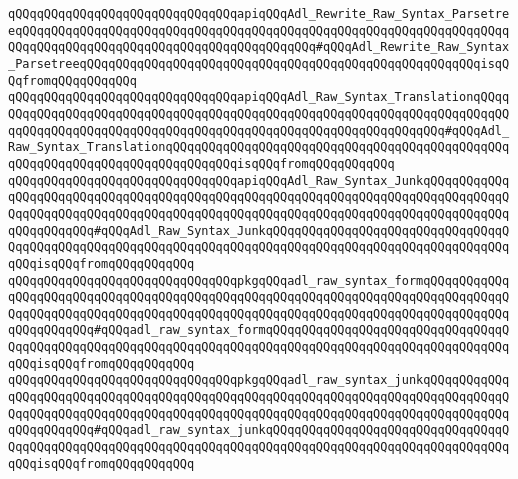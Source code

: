 \verb|qQQqqQQqqQQqqQQqqQQqqQQqqQQqqQQqapiqQQqAdl_Rewrite_Raw_Syntax_ParsetreeqQQqqQQqqQQqqQQqqQQqqQQqqQQqqQQqqQQqqQQqqQQqqQQqqQQqqQQqqQQqqQQqqQQqqQQqqQQqqQQqqQQqqQQqqQQqqQQqqQQqqQQqqQQqqQQq#qQQqAdl_Rewrite_Raw_Syntax_ParsetreeqQQqqQQqqQQqqQQqqQQqqQQqqQQqqQQqqQQqqQQqqQQqqQQqqQQqqQQqisqQQqfromqQQqqQQqqQQq|\newline
\verb|qQQqqQQqqQQqqQQqqQQqqQQqqQQqqQQqapiqQQqAdl_Raw_Syntax_TranslationqQQqqQQqqQQqqQQqqQQqqQQqqQQqqQQqqQQqqQQqqQQqqQQqqQQqqQQqqQQqqQQqqQQqqQQqqQQqqQQqqQQqqQQqqQQqqQQqqQQqqQQqqQQqqQQqqQQqqQQqqQQqqQQqqQQqqQQq#qQQqAdl_Raw_Syntax_TranslationqQQqqQQqqQQqqQQqqQQqqQQqqQQqqQQqqQQqqQQqqQQqqQQqqQQqqQQqqQQqqQQqqQQqqQQqqQQqqQQqisqQQqfromqQQqqQQqqQQq|\newline
\verb|qQQqqQQqqQQqqQQqqQQqqQQqqQQqqQQqapiqQQqAdl_Raw_Syntax_JunkqQQqqQQqqQQqqQQqqQQqqQQqqQQqqQQqqQQqqQQqqQQqqQQqqQQqqQQqqQQqqQQqqQQqqQQqqQQqqQQqqQQqqQQqqQQqqQQqqQQqqQQqqQQqqQQqqQQqqQQqqQQqqQQqqQQqqQQqqQQqqQQqqQQqqQQqqQQqqQQqqQQq#qQQqAdl_Raw_Syntax_JunkqQQqqQQqqQQqqQQqqQQqqQQqqQQqqQQqqQQqqQQqqQQqqQQqqQQqqQQqqQQqqQQqqQQqqQQqqQQqqQQqqQQqqQQqqQQqqQQqqQQqqQQqqQQqisqQQqfromqQQqqQQqqQQq|\newline
\newline
\verb|qQQqqQQqqQQqqQQqqQQqqQQqqQQqqQQqpkgqQQqadl_raw_syntax_formqQQqqQQqqQQqqQQqqQQqqQQqqQQqqQQqqQQqqQQqqQQqqQQqqQQqqQQqqQQqqQQqqQQqqQQqqQQqqQQqqQQqqQQqqQQqqQQqqQQqqQQqqQQqqQQqqQQqqQQqqQQqqQQqqQQqqQQqqQQqqQQqqQQqqQQqqQQqqQQqqQQq#qQQqadl_raw_syntax_formqQQqqQQqqQQqqQQqqQQqqQQqqQQqqQQqqQQqqQQqqQQqqQQqqQQqqQQqqQQqqQQqqQQqqQQqqQQqqQQqqQQqqQQqqQQqqQQqqQQqqQQqqQQqisqQQqfromqQQqqQQqqQQq|\newline
\verb|qQQqqQQqqQQqqQQqqQQqqQQqqQQqqQQqpkgqQQqadl_raw_syntax_junkqQQqqQQqqQQqqQQqqQQqqQQqqQQqqQQqqQQqqQQqqQQqqQQqqQQqqQQqqQQqqQQqqQQqqQQqqQQqqQQqqQQqqQQqqQQqqQQqqQQqqQQqqQQqqQQqqQQqqQQqqQQqqQQqqQQqqQQqqQQqqQQqqQQqqQQqqQQqqQQqqQQq#qQQqadl_raw_syntax_junkqQQqqQQqqQQqqQQqqQQqqQQqqQQqqQQqqQQqqQQqqQQqqQQqqQQqqQQqqQQqqQQqqQQqqQQqqQQqqQQqqQQqqQQqqQQqqQQqqQQqqQQqqQQqisqQQqfromqQQqqQQqqQQq|\newline
